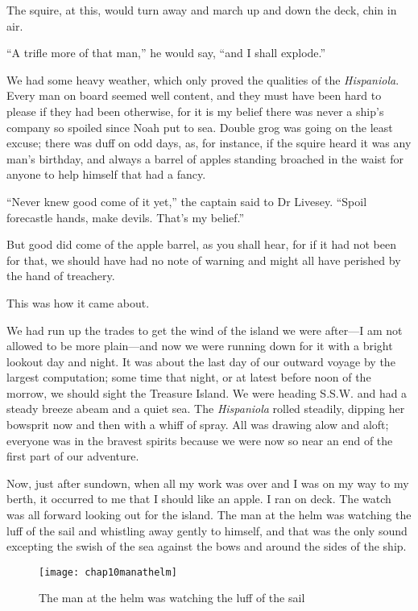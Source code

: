 The squire, at this, would turn away and march up and down the deck, chin in air.

\enquote{A trifle more of that man,} he would say, \enquote{and I shall explode.}

We had some heavy weather, which only proved the qualities of the \textit{Hispaniola}. Every man on board seemed well content, and they must have been hard to please if they had been otherwise, for it is my belief there was never a ship’s company so spoiled since Noah put to sea. Double grog was going on the least excuse; there was duff on odd days, as, for instance, if the squire heard it was any man’s birthday, and always a barrel of apples standing broached in the waist for anyone to help himself that had a fancy.

\enquote{Never knew good come of it yet,} the captain said to Dr Livesey. \enquote{Spoil forecastle hands, make devils. That’s my belief.}

But good did come of the apple barrel, as you shall hear, for if it had not been for that, we should have had no note of warning and might all have perished by the hand of treachery.

This was how it came about.

We had run up the trades to get the wind of the island we were after---I am not allowed to be more plain---and now we were running down for it with a bright lookout day and night. It was about the last day of our outward voyage by the largest computation; some time that night, or at latest before noon of the morrow, we should sight the Treasure Island. We were heading S.S.W. and had a steady breeze abeam and a quiet sea. The \textit{Hispaniola} rolled steadily, dipping her bowsprit now and then with a whiff of spray. All was drawing alow and aloft; everyone was in the bravest spirits because we were now so near an end of the first part of our adventure.

Now, just after sundown, when all my work was over and I was on my way to my berth, it occurred to me that I should like an apple. I ran on deck. The watch was all forward looking out for the island. The man at the helm was watching the luff of the sail and whistling away gently to himself, and that was the only sound excepting the swish of the sea against the bows and around the sides of the ship.

 \begin{figure}[p]
\centering
\texttt{[image: chap10manathelm]}
\caption{The man at the helm was watching the luff of the sail}
\end{figure}


